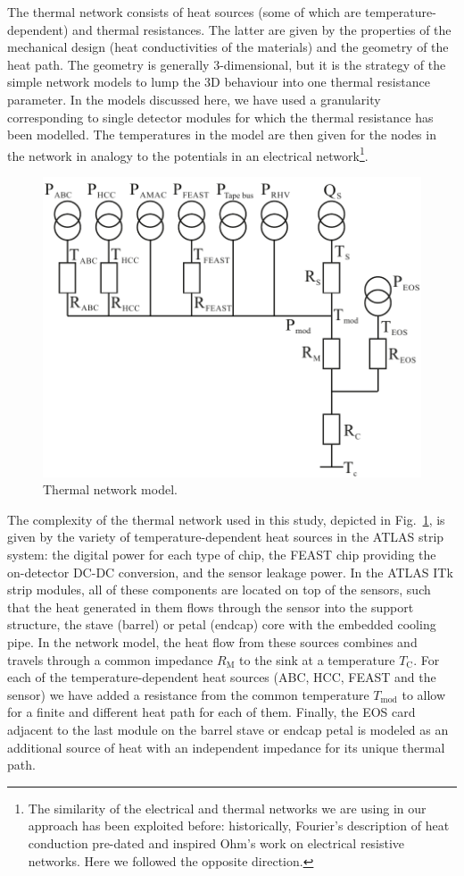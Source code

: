 The thermal network consists of heat sources (some of which are temperature-dependent) and thermal resistances. The latter are given by the properties of the mechanical design (heat conductivities of the materials) and the geometry of the heat path. The geometry is generally 3-dimensional, but it is the strategy of the simple network models to lump the 3D behaviour into one thermal resistance parameter. In the models discussed here, we have used a granularity corresponding to single detector modules for which the thermal resistance has been modelled. The temperatures in the model are then given for the nodes in the network in analogy to the potentials in an electrical network\footnote{The similarity of the electrical and thermal networks we are using in our approach has been exploited before: historically, Fourier's description of heat conduction pre-dated and inspired Ohm's work on electrical resistive networks. Here we followed the opposite direction.}.

\begin{figure}[t!]
\centering
\includegraphics[width=0.6\linewidth]{figures/Thermalmodel.pdf}
\caption{Thermal network model.}
\label{fig:thermalmodel}
\end{figure}

The complexity of the thermal network used in this study, depicted in Fig.~\ref{fig:thermalmodel}, is given by the variety of temperature-dependent heat sources in the ATLAS strip system: the digital power for each type of chip, the FEAST chip providing the on-detector DC-DC conversion, and the sensor leakage power. In the ATLAS ITk strip modules, all of these components are located on top of the sensors, such that the heat generated in them flows through the sensor into the support structure, the stave (barrel) or petal (endcap) core with the embedded cooling pipe. In the network model, the heat flow from these sources combines and travels through a common impedance $R_\text{M}$ to the sink at a temperature $T_\text{C}$. For each of the temperature-dependent heat sources (ABC, HCC, FEAST and the sensor) we have added a resistance from the common temperature $T_\text{mod}$ to allow for a finite and different heat path for each of them. Finally, the EOS card adjacent to the last module on the barrel stave or endcap petal is modeled as an additional source of heat with an independent impedance for its unique thermal path.

